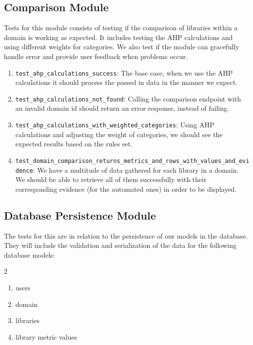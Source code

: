 \documentclass[12pt, titlepage]{article}
\begin{document}
\subsection{Comparison Module}
  Tests for this module consists of testing if the comparison of libraries within a domain is working as expected. It includes testing the AHP calculations and using different weights for categories.
  We also test if the module can gracefully handle error and provide user feedback when problems occur.
    \begin{enumerate}
      \item \texttt{test\_ahp\_calculations\_success}: The base case, when we use the AHP calculations it should process the passed in data in the manner we expect.
      \item \texttt{test\_ahp\_calculations\_not\_found}: Calling the comparison endpoint with an invalid domain id should return an error response, instead of failing.
      \item \texttt{test\_ahp\_calculations\_with\_weighted\_categories}: Using AHP calculations and adjusting the weight of categories, we should see the expected results based on the rules set.
      \item \texttt{test\_domain\_comparison\_returns\_metrics\_and\_rows\_with\_values\_and\_evidence}: We have a multitude of data gathered for each library in a domain. We should be able to retrieve all of them successfully with their corresponding evidence (for the automated ones) in order to be displayed.
    \end{enumerate}
  \subsection{Database Persistence Module}
    The tests for this are in relation to the persistence of our models in the database. They will include the validation and serialization of the data for the following database models:
    \begin{multicols}{2}
      \begin{enumerate}
        \item users
        \item domain
        \item libraries
        \item library metric values
      \end{enumerate}
    \end{multicols}

\end{document}
